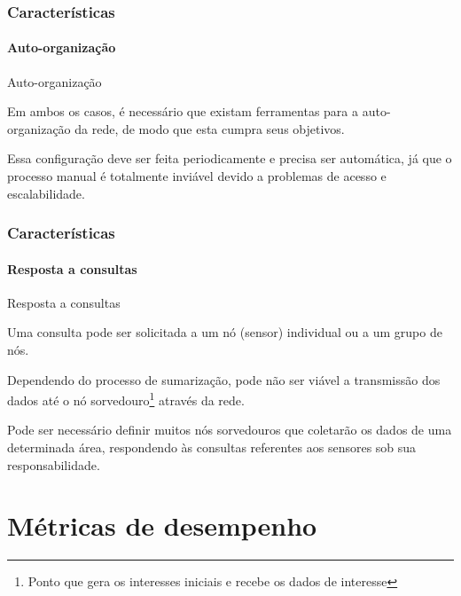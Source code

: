 \documentclass[notes]{beamer}
\begin{document}
\begin{frame}
\label{slide_22}
\frametitle{Características}
\framesubtitle{Auto-organização}

\begin{block}{Auto-organização}

Em ambos os casos, é necessário que existam ferramentas para a auto-organização da rede, de modo que esta cumpra seus objetivos.

\end{block} \pause

\begin{alertblock}

Essa configuração deve ser feita periodicamente e precisa ser automática, já que o processo manual é totalmente inviável devido a problemas de acesso e escalabilidade. 
\end{alertblock}

\end{frame}

\begin{frame}
\label{slide_23}
\frametitle{Características}
\framesubtitle{Resposta a consultas}

\begin{block}{Resposta a consultas}

Uma consulta pode ser solicitada a um nó (sensor) individual ou a um grupo de nós.

\end{block} \pause

\begin{block}

Dependendo do processo de sumarização, pode não ser viável a transmissão dos dados até o nó sorvedouro\footnote{Ponto que gera os interesses iniciais e recebe os dados de interesse} através da rede. 
\end{block} \pause

\begin{block}

Pode ser necessário definir muitos nós sorvedouros que coletarão os dados de uma determinada área, respondendo às consultas referentes aos sensores sob sua responsabilidade.
\end{block} 

\end{frame}

\section{Métricas de desempenho}
\end{document}
